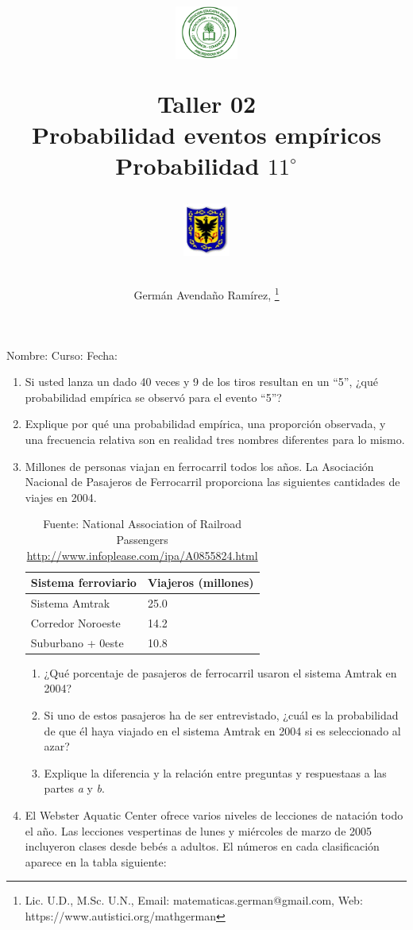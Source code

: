 \documentclass[11pt,twoside]{article}
\author{Germ\'an Avenda\~no Ram\'irez, \thanks{Lic. U.D., M.Sc. U.N., Email: matematicas.german@gmail.com, Web: https://www.autistici.org/mathgerman}}
\title{\begin{minipage}{.2\textwidth}
\includegraphics[height=1.75cm]{Images/logo-colegio.png}\end{minipage}
\begin{minipage}{.55\textwidth}
\begin{center}
Taller 02\\
Probabilidad eventos empíricos\\
Probabilidad $11^{\circ}$
\end{center}
\end{minipage}\hfill
\begin{minipage}{.2\textwidth}
\includegraphics[height=1.75cm]{Images/logo-sed.png} 
\end{minipage}}
\date{}
\begin{document}
\maketitle
Nombre: \hrulefill Curso: \underline{\hspace*{44pt}} Fecha: \underline{\hspace*{2.5cm}}
 \begin{enumerate}
  \item Si usted lanza un dado 40 veces y 9 de los tiros resultan en un ``5'', ¿qué probabilidad empírica se observó para el evento ``5''?
  \item Explique por qué una probabilidad empírica, una proporción observada, y una frecuencia relativa son en realidad tres nombres diferentes para lo mismo.
  \item Millones de personas viajan en ferrocarril todos los años. La Asociación Nacional de Pasajeros de Ferrocarril proporciona las siguientes cantidades de viajes en 2004.
  \begin{table}[h!]
\begin{center}
\begin{tabular}{ll}
Sistema ferroviario & Viajeros (millones)\\ \hline
Sistema Amtrak & 25.0\\
Corredor Noroeste & 14.2\\
Suburbano + 0este & 10.8 \\ \hline
  \end{tabular}
  \end{center}\caption{Fuente: National Association of Railroad Passengers \url{http://www.infoplease.com/ipa/A0855824.html}}
              \end{table} 
\begin{enumerate}
 \item ¿Qué porcentaje de pasajeros de ferrocarril usaron
el sistema Amtrak en 2004?
\item Si uno de estos pasajeros ha de ser entrevistado, ¿cuál es la probabilidad de que él haya viajado en el sistema Amtrak en 2004 si es seleccionado al azar?
\item Explique la diferencia y la relación entre preguntas y respuestaas  a las partes \textit{a} y \textit{b}.
\end{enumerate}
\item El Webster Aquatic Center ofrece varios niveles de lecciones de natación todo el año. Las lecciones vespertinas de lunes y miércoles de marzo de 2005 incluyeron clases desde bebés a adultos. El números en cada clasificación aparece en la tabla siguiente:

\end{enumerate}
\end{document}
